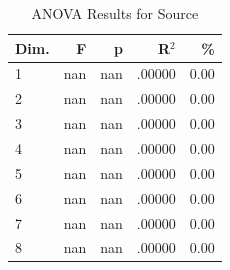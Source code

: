\begin{table}[H]
  \centering
  \caption{ANOVA Results for Source}
  \label{tab:anova_source}
  \begin{tabular}{l r r r r}
    Dim. & F & p & R$^2$ & \% \\
    \hline
    1 & nan & nan & .00000 & 0.00 \\
    2 & nan & nan & .00000 & 0.00 \\
    3 & nan & nan & .00000 & 0.00 \\
    4 & nan & nan & .00000 & 0.00 \\
    5 & nan & nan & .00000 & 0.00 \\
    6 & nan & nan & .00000 & 0.00 \\
    7 & nan & nan & .00000 & 0.00 \\
    8 & nan & nan & .00000 & 0.00 \\
  \end{tabular}
\end{table}
